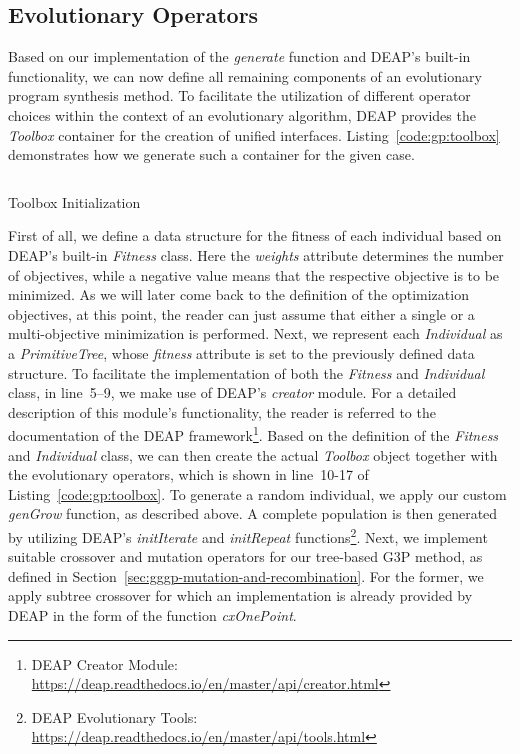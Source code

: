\subsection{Evolutionary Operators}
Based on our implementation of the \emph{generate} function and DEAP's built-in functionality, we can now define all remaining components of an evolutionary program synthesis method.
To facilitate the utilization of different operator choices within the context of an evolutionary algorithm, DEAP provides the \emph{Toolbox} container for the creation of unified interfaces.
Listing~\ref{code:gp:toolbox} demonstrates how we generate such a container for the given case.
\begin{listing}
	\inputminted[linenos]{python}{evostencils/gp/toolbox.py}
	\caption{Toolbox Initialization}
	\label{code:gp:toolbox}
\end{listing}
First of all, we define a data structure for the fitness of each individual based on DEAP's built-in \emph{Fitness} class.
Here the \emph{weights} attribute determines the number of objectives, while a negative value means that the respective objective is to be minimized.
As we will later come back to the definition of the optimization objectives, at this point, the reader can just assume that either a single or a multi-objective minimization is performed.
Next, we represent each \emph{Individual} as a \emph{PrimitiveTree}, whose \emph{fitness} attribute is set to the previously defined data structure.
To facilitate the implementation of both the \emph{Fitness} and \emph{Individual} class, in line~5--9, we make use of DEAP's \emph{creator} module.
For a detailed description of this module's functionality, the reader is referred to the documentation of the DEAP framework\footnote{DEAP Creator Module: \url{https://deap.readthedocs.io/en/master/api/creator.html}}.
Based on the definition of the \emph{Fitness} and \emph{Individual} class, we can then create the actual \emph{Toolbox} object together with the evolutionary operators, which is shown in line~10-17 of Listing~\ref{code:gp:toolbox}.
To generate a random individual, we apply our custom \emph{genGrow} function, as described above.
A complete population is then generated by utilizing DEAP's \emph{initIterate} and \emph{initRepeat} functions\footnote{DEAP Evolutionary Tools: \url{https://deap.readthedocs.io/en/master/api/tools.html}}.
Next, we implement suitable crossover and mutation operators for our tree-based G3P method, as defined in Section~\ref{sec:gggp-mutation-and-recombination}.
For the former, we apply subtree crossover for which an implementation is already provided by DEAP in the form of the function \emph{cxOnePoint}.
